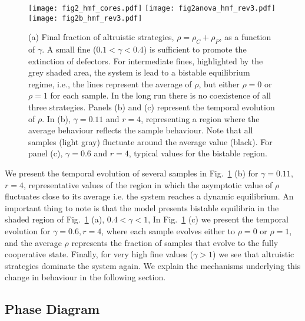\documentclass[5p]{elsarticle}
\begin{document}
\begin{figure}[t]
\begin{center}
\texttt{[image: fig2\_hmf\_cores.pdf]}
\texttt{[image: fig2anova\_hmf\_rev3.pdf]}
\texttt{[image: fig2b\_hmf\_rev3.pdf]}
\caption{ (a) Final fraction of altruistic strategies, $\rho=\rho_C+\rho_P$, as a function of $\gamma$. A small fine ($0.1<\gamma<0.4$) is sufficient to promote the extinction of defectors. For intermediate fines, highlighted by the grey shaded area, the system is lead to a bistable equilibrium regime, i.e., the lines represent the average of $\rho$, but either $\rho=0$ or $\rho=1$ for each sample. In the long run there is no coexistence of all three strategies. Panels (b) and (c) represent the temporal evolution of $\rho$. In (b), $\gamma=0.11$ and $r=4$, representing a region where the average behaviour reflects the sample behaviour. Note that all samples (light gray) fluctuate around the average value (black). For panel (c),  $\gamma=0.6$ and $r=4$, typical values for the  bistable region.}
\label{fig-vargamma}
\end{center}
\end{figure}


We present the temporal evolution of several samples in Fig.~\ref{fig-vargamma} (b) for $\gamma=0.11$, $r=4$, representative values of the region in which the asymptotic value of $\rho$ fluctuates close to its average i.e. the system reaches a dynamic equilibrium. An important thing to note is that the model presents bistable equilibria in the shaded region of Fig.~\ref{fig-vargamma} (a), $0.4<\gamma<1$, In Fig.~\ref{fig-vargamma} (c) we present the temporal evolution for $\gamma=0.6,r=4$, where each sample evolves either to $\rho=0$ or $\rho=1$, and the average $\rho$ represents the fraction of samples that evolve to the fully cooperative state. 
% 
Finally, for very high fine values ($\gamma>1$) we see that altruistic strategies dominate the system again. We explain the mechanisms underlying this change in behaviour in the following section.

\subsection{Phase Diagram}
\label{sec.phasediagram}
\end{document}
